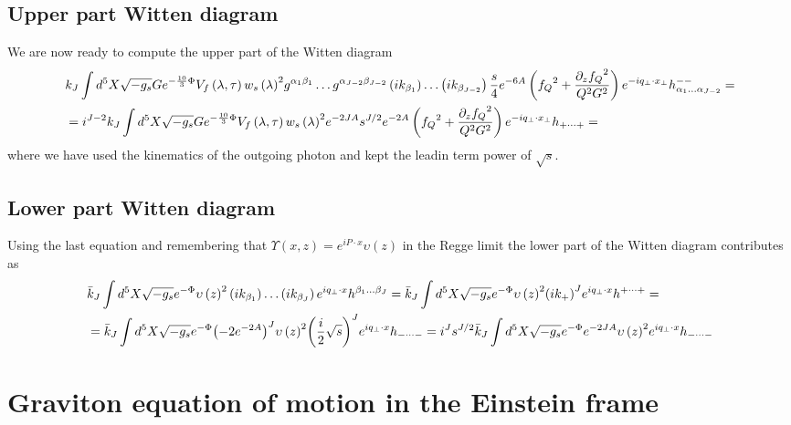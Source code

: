 \documentclass[a4paper,12pt]{article}
\begin{document}
\subsection*{Upper part Witten diagram}
We are now ready to compute the upper part of the Witten diagram
\begin{align}
&k_J \int d^5X \sqrt{-g_s} G e^{-\frac{10}{3}\Phi} V_f \left( \lambda, \tau \right) {w_s\left(\lambda \right)}^2 g^{\alpha_1 \beta_1} \dots g^{\alpha_{J-2} \beta_{J-2}} \left( i k_{\beta_1}\right) \dots  \left( i k_{\beta_{J-2}}\right)  \frac{s}{4} e^{-6A} \left(  {f_Q}^2 + \frac{{\partial_z f_Q}^2}{Q^2 G^2}  \right) e^{-i q_\perp \cdot x_\perp} h^{--}_{\alpha_1 \dots \alpha_{J-2}} = \notag \\
& = i^{J-2} k_J \int d^5X \sqrt{-g_s} G e^{-\frac{10}{3}\Phi} V_f \left( \lambda, \tau \right) {w_s\left(\lambda \right)}^2 e^{-2 J A}  s^{J/2} e^{-2A} \left(  {f_Q}^2 + \frac{{\partial_z f_Q}^2}{Q^2 G^2}  \right) e^{-i q_\perp \cdot x_\perp} h_{+ \dots +} =
\end{align}
where we have used the kinematics of the outgoing photon and kept the leadin term power of $\sqrt{s}$.

\subsection*{Lower part Witten diagram}
Using the last equation and remembering that $\Upsilon\left(x, z\right) = e^{i P \cdot x} \upsilon\left(z\right)$ in the Regge limit the lower part of the Witten diagram contributes as
\begin{align}
&\bar{k}_J \int d^5 X \sqrt{-g_s} e^{-\Phi}  {\upsilon\left(z\right)}^2 \left( i k_{\beta_1}\right) \dots \left( i k_{\beta_J}\right) e^{i q_\perp \cdot x}  h^{\beta_1 \dots \beta_J} = \bar{k}_J \int d^5 X \sqrt{-g_s} e^{-\Phi}  {\upsilon\left(z\right)}^2 {\left( i k_+\right)}^J e^{i q_\perp \cdot x}  h^{+ \dots +} = \notag \\
& = \bar{k}_J \int d^5 X \sqrt{-g_s} e^{-\Phi} {\left( - 2 e^{-2 A}\right)}^J {\upsilon\left(z\right)}^2 {\left( \frac{i}{2} \sqrt{s}\right)}^J e^{i q_\perp \cdot x}  h_{- \dots -}  = i^J s^{J/2}  \bar{k}_J \int d^5 X \sqrt{-g_s} e^{-\Phi} e^{-2 J A} {\upsilon\left(z\right)}^2 e^{i q_\perp \cdot x}  h_{- \dots -}
\end{align}

\section{Graviton equation of motion in the Einstein frame}
\label{appendix:graviton_eom}
\end{document}
